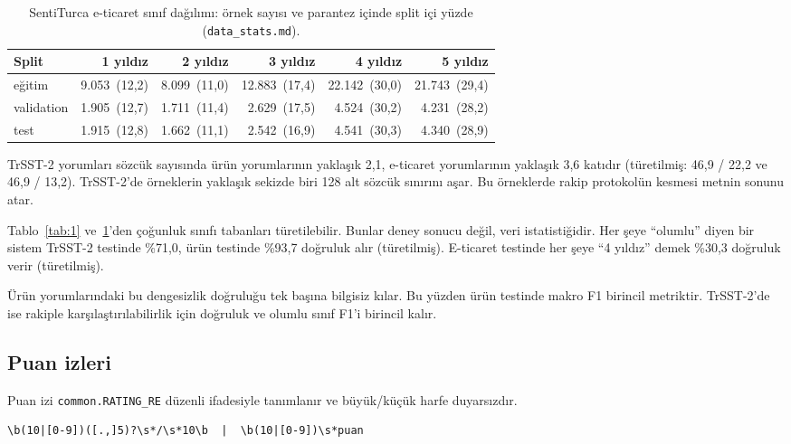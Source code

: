 \documentclass[11pt]{article}
\begin{document}
\begin{table}[!htbp]
\centering
\footnotesize
\setlength{\tabcolsep}{3pt}
\begin{tabular}{lrrrrr}
\toprule
Split & 1 yıldız & 2 yıldız & 3 yıldız & 4 yıldız & 5 yıldız \\
\midrule
eğitim & \mbox{9.053 (12,2)} & \mbox{8.099 (11,0)} & \mbox{12.883 (17,4)} & \mbox{22.142 (30,0)} & \mbox{21.743 (29,4)} \\
validation & \mbox{1.905 (12,7)} & \mbox{1.711 (11,4)} & \mbox{2.629 (17,5)} & \mbox{4.524 (30,2)} & \mbox{4.231 (28,2)} \\
test & \mbox{1.915 (12,8)} & \mbox{1.662 (11,1)} & \mbox{2.542 (16,9)} & \mbox{4.541 (30,3)} & \mbox{4.340 (28,9)} \\
\bottomrule
\end{tabular}
\caption{SentiTurca e-ticaret sınıf dağılımı: örnek sayısı ve parantez içinde split içi yüzde (\texttt{data\_\allowbreak{}\allowbreak{}stats.\allowbreak{}\allowbreak{}md}).}
\label{tab:2}
\end{table}

TrSST-2 yorumları sözcük sayısında ürün yorumlarının yaklaşık 2,1, e-ticaret yorumlarının yaklaşık 3,6 katıdır (türetilmiş: 46,9 / 22,2 ve 46,9 / 13,2). TrSST-2'de örneklerin yaklaşık sekizde biri 128 alt sözcük sınırını aşar. Bu örneklerde rakip protokolün kesmesi metnin sonunu atar.

Tablo~\ref{tab:1} ve~\ref{tab:2}'den çoğunluk sınıfı tabanları türetilebilir. Bunlar deney sonucu değil, veri istatistiğidir. Her şeye ``olumlu'' diyen bir sistem TrSST-2 testinde \%71,0, ürün testinde \%93,7 doğruluk alır (türetilmiş). E-ticaret testinde her şeye ``4 yıldız'' demek \%30,3 doğruluk verir (türetilmiş).

Ürün yorumlarındaki bu dengesizlik doğruluğu tek başına bilgisiz kılar. Bu yüzden ürün testinde makro F1 birincil metriktir. TrSST-2'de ise rakiple karşılaştırılabilirlik için doğruluk ve olumlu sınıf F1'i birincil kalır.

\subsection{Puan izleri}

Puan izi \texttt{common.\allowbreak{}\allowbreak{}RATING\_\allowbreak{}\allowbreak{}RE} düzenli ifadesiyle tanımlanır ve büyük/\allowbreak{}küçük harfe duyarsızdır.

\begin{Verbatim}[breaklines,breakanywhere,fontsize=\scriptsize]
\b(10|[0-9])([.,]5)?\s*/\s*10\b  |  \b(10|[0-9])\s*puan
\end{Verbatim}
\end{document}
